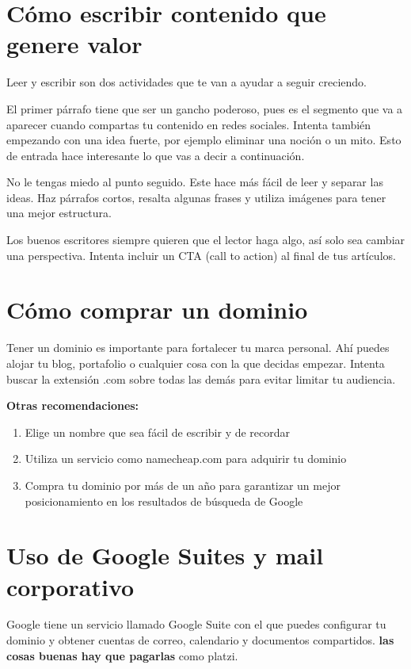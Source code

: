 \documentclass{article}
\begin{document}
    

    \newpage
    \tableofcontents
    \newpage

    \section{Cómo escribir contenido que genere valor}   
    Leer y escribir son dos actividades que te van a ayudar a seguir creciendo.

    El primer párrafo tiene que ser un gancho poderoso, pues es el segmento que va a aparecer cuando compartas tu contenido en redes sociales. Intenta también empezando con una idea fuerte, por ejemplo eliminar una noción o un mito. Esto de entrada hace interesante lo que vas a decir a continuación.

    No le tengas miedo al punto seguido. Este hace más fácil de leer y separar las ideas. Haz párrafos cortos, resalta algunas frases y utiliza imágenes para tener una mejor estructura.

    Los buenos escritores siempre quieren que el lector haga algo, así solo sea cambiar una perspectiva. Intenta incluir un CTA (call to action) al final de tus artículos.

    \section{Cómo comprar un dominio}
        Tener un dominio es importante para fortalecer tu marca personal. Ahí puedes alojar tu blog, portafolio o cualquier cosa con la que decidas empezar. Intenta buscar la extensión .com sobre todas las demás para evitar limitar tu audiencia.

        \textbf{Otras recomendaciones:}

        \begin{enumerate}
            \item Elige un nombre que sea fácil de escribir y de recordar
            \item Utiliza un servicio como namecheap.com para adquirir tu dominio
            \item Compra tu dominio por más de un año para garantizar un mejor posicionamiento en los resultados de búsqueda de Google
        \end{enumerate}
    
    \section{Uso de Google Suites y mail corporativo}
        Google tiene un servicio llamado Google Suite con el que puedes configurar tu dominio y obtener cuentas de correo, calendario y documentos compartidos.
        \textbf{las cosas buenas hay que pagarlas} como platzi.
    
\end{document}
